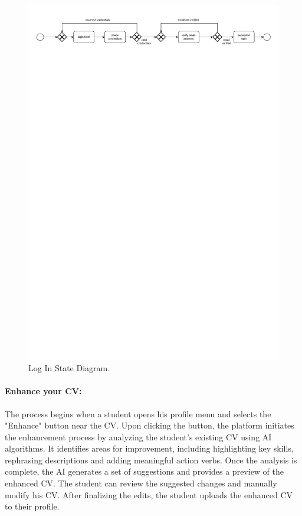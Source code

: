 \begin{figure}[H]
    \begin{center}
        \includegraphics[width=\linewidth]{Images/StateDiagram/Login.pdf}
        \caption{Log In State Diagram.}
        \label{fig:log_in_state_diag}%
    \end{center}
\end{figure}


\paragraph{Enhance your CV:} The process begins when a student opens his
  profile menu and selects the "Enhance" button near the CV. Upon clicking
  the button, the platform initiates the enhancement process by
  analyzing the student's existing CV using AI algorithms. It identifies 
  areas for improvement, including highlighting key skills, rephrasing
  descriptions and adding meaningful action verbs. Once the analysis is
  complete, the AI generates a set of suggestions and provides a preview
  of the enhanced CV. The student can review the suggested changes and
  manually modify his CV. After finalizing the edits, the student
  uploads the enhanced CV to their profile.

